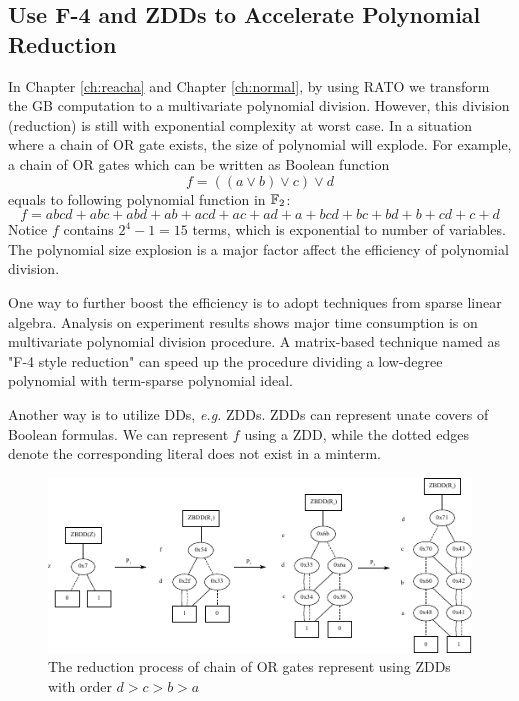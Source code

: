 \subsection{Use F-4 and ZDDs to Accelerate Polynomial Reduction}
In Chapter \ref{ch:reacha} and Chapter \ref{ch:normal}, by using RATO we transform the GB 
computation to a multivariate polynomial division. However, this division (reduction)
is still with exponential complexity at worst case. In a situation where 
a chain of OR gate exists, the size of polynomial will explode. For example, a chain of OR gates 
which can be written as Boolean function 
\begin{equation}
\label{eqn:chainOR}
f = ((a\lor b) \lor c) \lor d
\end{equation}
equals to following polynomial function in ${\mathbb{F}}_2$:
$$f = abcd+abc+abd+ab+acd+ac+ad+a+bcd+bc+bd+b+cd+c+d$$
Notice $f$ contains $2^4-1 = 15$ terms, which is exponential to number of variables.
The polynomial size explosion is a major factor affect the efficiency of polynomial division.

One way to further boost the efficiency is to adopt techniques from sparse linear algebra.
Analysis on experiment results shows major time consumption is on multivariate polynomial division procedure.
A matrix-based technique named as "F-4 style reduction" \cite{f4} can speed up the procedure
dividing a low-degree polynomial with term-sparse polynomial ideal. 

Another way is to utilize DDs, {\it e.g.} ZDDs. ZDDs can represent unate covers of Boolean formulas.
We can represent $f$ using a ZDD, while the dotted edges denote the corresponding literal does not 
exist in a minterm.

\begin{figure}[h]
\centerline{
\includegraphics[width=\textwidth]{newfig/red_steps}
}
\caption{The reduction process of chain of OR gates represent using ZDDs with order $d>c>b>a$}
\label{fig:ZDD}
\end{figure}

